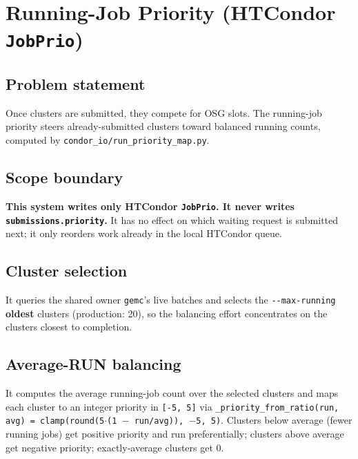 \section{Running-Job Priority (HTCondor \texttt{JobPrio})}\label{ch:11}

\subsection{Problem statement}

Once clusters are submitted, they compete for OSG slots. The running-job priority steers already-submitted
clusters toward balanced running counts, computed by
\texttt{condor\_\allowbreak{}io/\allowbreak{}run\_\allowbreak{}priority\_\allowbreak{}map.\allowbreak{}py}.

\subsection{Scope boundary}

\textbf{This system writes only HTCondor \texttt{JobPrio}. It never writes
\texttt{submissions.\allowbreak{}priority}.} It has no effect on which waiting request is submitted next; it
only reorders work already in the local HTCondor queue.

\subsection{Cluster selection}

It queries the shared owner \texttt{gemc}'s live batches and selects the
\texttt{-\allowbreak{}-\allowbreak{}max-\allowbreak{}running} \textbf{oldest} clusters (production: 20), so the
balancing effort concentrates on the clusters closest to completion.

\subsection{Average-RUN balancing}

It computes the average running-job count over the selected clusters and maps each cluster to an integer
priority in \texttt{[-\allowbreak{}5, 5]} via
\texttt{\_\allowbreak{}priority\_\allowbreak{}from\_\allowbreak{}ratio(run, avg) =\allowbreak{}
clamp(round(5$\cdot$(1 $-\allowbreak{}$ run/\allowbreak{}avg)), $-\allowbreak{}$5, 5)}. Clusters below average
(fewer running jobs) get positive priority and run preferentially; clusters above average get negative
priority; exactly-average clusters get 0.

